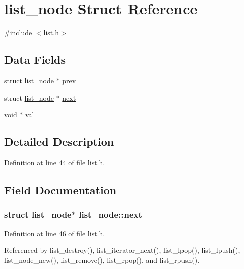 \hypertarget{structlist__node}{}\section{list\+\_\+node Struct Reference}
\label{structlist__node}


{\ttfamily \#include $<$list.\+h$>$}

\subsection*{Data Fields}
\begin{DoxyCompactItemize}
\item 
struct \hyperlink{structlist__node}{list\+\_\+node} $\ast$ \hyperlink{structlist__node_a30baba3b27442cbca9694076003ed65e}{prev}
\item 
struct \hyperlink{structlist__node}{list\+\_\+node} $\ast$ \hyperlink{structlist__node_a0b99ca890dbfe832a8475f4bbd72338c}{next}
\item 
void $\ast$ \hyperlink{structlist__node_a129de89b4c110fa54377ef16ab128ce0}{val}
\end{DoxyCompactItemize}


\subsection{Detailed Description}


Definition at line 44 of file list.\+h.



\subsection{Field Documentation}
\subsubsection[{\texorpdfstring{next}{next}}]{\setlength{\rightskip}{0pt plus 5cm}struct {\bf list\+\_\+node}$\ast$ list\+\_\+node\+::next}\hypertarget{structlist__node_a0b99ca890dbfe832a8475f4bbd72338c}{}\label{structlist__node_a0b99ca890dbfe832a8475f4bbd72338c}


Definition at line 46 of file list.\+h.



Referenced by list\+\_\+destroy(), list\+\_\+iterator\+\_\+next(), list\+\_\+lpop(), list\+\_\+lpush(), list\+\_\+node\+\_\+new(), list\+\_\+remove(), list\+\_\+rpop(), and list\+\_\+rpush().

